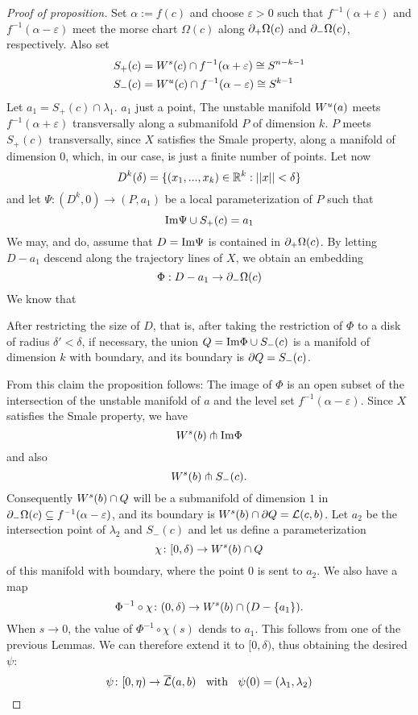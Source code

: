 \begin{proof}[Proof of proposition]
    Set $\alpha := f(c)$ and choose $\varepsilon > 0$ such that $f^{-1}(\alpha + \varepsilon)$
    and $f^{-1}(\alpha - \varepsilon)$ meet the morse chart $\Omega(c)$ along ${ \partial }_+\Omega(c)$
    and ${ \partial }_-\Omega(c)$, respectively. Also set
    \begin{align*}
        S_+(c) & = { W^s } (c) \cap f^{-1}(\alpha + \varepsilon) \cong S^{n - k - 1} \\
        S_-(c) & = { W^u } (c) \cap f^{-1}(\alpha - \varepsilon) \cong S^{k - 1}
    \end{align*}
    Let $a_1 = S_+(c) \cap \lambda_1$. $a_1$ just a point, The unstable manifold ${ W^u } (a)$ meets 
    $f^{-1}(\alpha + \varepsilon)$ transversally along a submanifold $P$ of dimension $k$. $P$
    meets $S_+(c)$ transversally, since $X$ satisfies the Smale property, along a manifold of
    dimension $0$, which, in our case, is just a finite number of points. Let now 
    \[ D^k(\delta) = \{ (x_1, ..., x_k) \in { \mathbb R }^k : ||x|| < \delta \} \]
    and let $\Psi \colon (D^k, 0) \to (P, a_1)$ be a local parameterization of $P$ such that
    \[ { \operatorname{Im} } \Psi \cup S_+(c) = a_1 \]
    We may, and do, assume that $D = { \operatorname{Im} } \Psi$ is contained in ${ \partial }_+\Omega(c)$.
    By letting $D - {a_1}$ descend along the trajectory lines of $X$, we obtain an embedding
    \[ \Phi: D - {a_1} \to { \partial }_- \Omega (c) \]
    We know that 
    \begin{claim*}
        After restricting the size of $D$, that is, after taking the restriction of $\Phi$ to 
        a disk of radius $\delta' < \delta$, if necessary, the union $Q = { \operatorname{Im} } \Phi \cup S_- (c)$
        is a manifold of dimension $k$ with boundary, and its boundary is ${ \partial } Q = S_- (c)$.
    \end{claim*}
    From this claim the proposition follows: The image of $\Phi$ is an open subset of the intersection 
    of the unstable manifold of $a$ and the level set $f^{-1}(\alpha - \varepsilon)$. Since $X$ 
    satisfies the Smale property, we have 
    \[ { W^s } (b) \pitchfork { \operatorname{Im} } \Phi \]
    and also 
    \[ { W^s } (b) \pitchfork S_- (c) . \]
    Consequently ${ W^s } (b) \cap Q$ will be a submanifold of dimension $1$ in 
    ${ \partial }_- \Omega (c) \subseteq f^{-1}(\alpha - \varepsilon)$, and its boundary is 
    ${ W^s } (b) \cap { \partial } Q = { \mathcal{L} } (c, b)$. 
    Let $a_2$ be the intersection point of $\lambda_2$ and $S_-(c)$ and let us define a 
    parameterization
    \[ \chi \colon [0, \delta) \to { W^s } (b) \cap Q \]
    of this manifold with boundary, where the point $0$ is sent to $a_2$. We also have a map 
    \[ \Phi^{-1} \circ \chi \colon (0, \delta) \to { W^s } (b) \cap (D - \{ a_1 \}) . \]
    When $s \to 0$, the value of $\Phi^{-1} \circ \chi (s)$ dends to $a_1$. This follows from 
    one of the previous Lemmas. We can therefore extend it to $[0, \delta)$, thus obtaining 
    the desired $\psi$:
    \[ 
        \psi \colon [0, \eta) \to {\overline{\mathcal{L}} } (a, b) \;\; \text{ with } \;\; 
        \psi (0) = (\lambda_1, \lambda_2) 
    \]
\end{proof}
